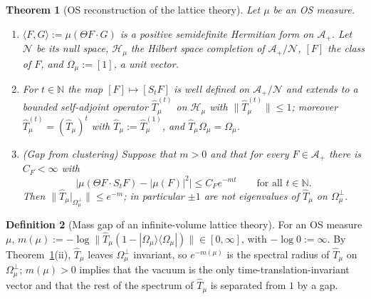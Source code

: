 \documentclass[11pt,a4paper]{article}
\newtheorem{theorem}{Theorem}[section]
\theoremstyle{definition}
\newtheorem{definition}[theorem]{Definition}
\theoremstyle{remark}
\newcommand{\N}{\mathbb{N}}
\newcommand{\cH}{\mathcal{H}}
\newcommand{\cA}{\mathcal{A}}
\newcommand{\cN}{\mathcal{N}}
\newcommand{\hT}{\hat{T}}
\newcommand{\ip}[2]{\langle #1,#2\rangle}
\newcommand{\norm}[1]{\lVert #1\rVert}
\begin{document}
\begin{theorem}[OS reconstruction of the lattice theory]\label{iv:thm:OS}
Let $\mu$ be an OS measure.
\begin{enumerate}[label=(\roman*)]
\item $\ip FG:=\mu(\Theta F\cdot G)$ is a positive semidefinite Hermitian form on $\cA_+$. Let $\cN$ be its null space, $\cH_\mu$ the
Hilbert space completion of $\cA_+/\cN$, $[F]$ the class of $F$, and $\Omega_\mu:=[1]$, a unit vector.
\item For $t\in\N$ the map $[F]\mapsto[S_tF]$ is well defined on $\cA_+/\cN$ and extends to a bounded self-adjoint operator
$\hT^{(t)}_\mu$ on $\cH_\mu$ with $\norm{\hT^{(t)}_\mu}\le1$; moreover $\hT^{(t)}_\mu=(\hT_\mu)^t$ with $\hT_\mu:=\hT^{(1)}_\mu$, and
$\hT_\mu\Omega_\mu=\Omega_\mu$.
\item \emph{(Gap from clustering)} Suppose that $m>0$ and that for every $F\in\cA_+$ there is $C_F<\infty$ with
\[
\bigl|\mu(\Theta F\cdot S_tF)-|\mu(F)|^2\bigr|\le C_Fe^{-mt}\qquad\text{for all }t\in\N .
\]
Then $\norm{\hT_\mu|_{\Omega_\mu^\perp}}\le e^{-m}$; in particular $\pm1$ are not eigenvalues of $\hT_\mu$ on $\Omega_\mu^\perp$.
\end{enumerate}
\end{theorem}

\begin{definition}[Mass gap of an infinite-volume lattice theory]\label{iv:def:gap}
For an OS measure $\mu$, $m(\mu):=-\log\norm{\hT_\mu(1-|\Omega_\mu\rangle\langle\Omega_\mu|)}\in[0,\infty]$, with $-\log0:=\infty$.
By Theorem~\ref{iv:thm:OS}(ii), $\hT_\mu$ leaves $\Omega_\mu^\perp$ invariant, so $e^{-m(\mu)}$ is the spectral radius of $\hT_\mu$ on
$\Omega_\mu^\perp$; $m(\mu)>0$ implies that the vacuum is the only time-translation-invariant vector and that the rest of the
spectrum of $\hT_\mu$ is separated from $1$ by a gap.
\end{definition}
\end{document}

